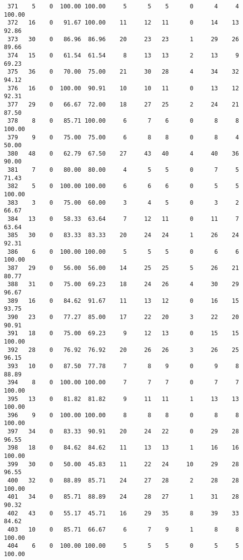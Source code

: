 \begin{verbatim}
 371    5    0  100.00 100.00     5      5    5      0      4     4   100.00
 372   16    0   91.67 100.00    11     12   11      0     14    13    92.86
 373   30    0   86.96  86.96    20     23   23      1     29    26    89.66
 374   15    0   61.54  61.54     8     13   13      2     13     9    69.23
 375   36    0   70.00  75.00    21     30   28      4     34    32    94.12
 376   16    0  100.00  90.91    10     10   11      0     13    12    92.31
 377   29    0   66.67  72.00    18     27   25      2     24    21    87.50
 378    8    0   85.71 100.00     6      7    6      0      8     8   100.00
 379    9    0   75.00  75.00     6      8    8      0      8     4    50.00
 380   48    0   62.79  67.50    27     43   40      4     40    36    90.00
 381    7    0   80.00  80.00     4      5    5      0      7     5    71.43
 382    5    0  100.00 100.00     6      6    6      0      5     5   100.00
 383    3    0   75.00  60.00     3      4    5      0      3     2    66.67
 384   13    0   58.33  63.64     7     12   11      0     11     7    63.64
 385   30    0   83.33  83.33    20     24   24      1     26    24    92.31
 386    6    0  100.00 100.00     5      5    5      0      6     6   100.00
 387   29    0   56.00  56.00    14     25   25      5     26    21    80.77
 388   31    0   75.00  69.23    18     24   26      4     30    29    96.67
 389   16    0   84.62  91.67    11     13   12      0     16    15    93.75
 390   23    0   77.27  85.00    17     22   20      3     22    20    90.91
 391   18    0   75.00  69.23     9     12   13      0     15    15   100.00
 392   28    0   76.92  76.92    20     26   26      3     26    25    96.15
 393   10    0   87.50  77.78     7      8    9      0      9     8    88.89
 394    8    0  100.00 100.00     7      7    7      0      7     7   100.00
 395   13    0   81.82  81.82     9     11   11      1     13    13   100.00
 396    9    0  100.00 100.00     8      8    8      0      8     8   100.00
 397   34    0   83.33  90.91    20     24   22      0     29    28    96.55
 398   18    0   84.62  84.62    11     13   13      1     16    16   100.00
 399   30    0   50.00  45.83    11     22   24     10     29    28    96.55
 400   32    0   88.89  85.71    24     27   28      2     28    28   100.00
 401   34    0   85.71  88.89    24     28   27      1     31    28    90.32
 402   43    0   55.17  45.71    16     29   35      8     39    33    84.62
 403   10    0   85.71  66.67     6      7    9      1      8     8   100.00
 404    6    0  100.00 100.00     5      5    5      0      5     5   100.00

\end{verbatim}
